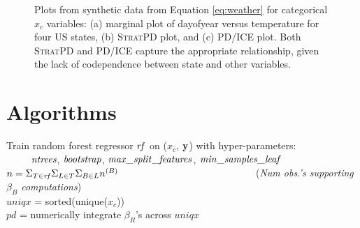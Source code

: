 \documentclass[12pt]{article}
\newcommand{\spd}{\fontfamily{cmr}\textsc{\small StratPD}}
\newcommand{\xnc}{$x_{\overline{c}}$}
\begin{document}
{\begin{appendices}
\begin{figure}[htbp]
\begin{center}
\caption{Plots from synthetic data from Equation \eqref{eq:weather} for categorical $x_c$ variables: (a) marginal plot of dayofyear versus temperature for four US states, (b) \spd{} plot, and (c) PD/ICE plot. Both \spd{} and PD/ICE capture the appropriate relationship, given the lack of codependence between state and other variables.}
\label{fig:state_vs_temp}
\end{center}
\end{figure}

\newpage
\section{Algorithms}\label{appendix:algorithms}

\setlength{\algomargin}{5pt}
\begin{algorithm}[]
\DontPrintSemicolon
\LinesNumbered
{}
\SetAlgoSkip{}
\SetInd{.5em}{.5em}
\small
{}
Train random forest regressor $\it rf$ on (\xnc{}, $\bf y$) with hyper-parameters:\\
~~~~~$\it ntrees$, $\it bootstrap$, $\it max\_split\_features$, ${\it min\_samples\_leaf}$ \\
$n = \Sigma_{T \in {\it rf}} \Sigma_{L \in T} \Sigma_{B \in L} n^{(B)}$~~~~~~~~~~~~~~~~~~~~~~~~~~~~({\it Num obs.'s supporting $\beta_B$ computations})\\
$uniqx$ = sorted(unique($x_c$))\\
$pd$ = numerically integrate $\beta_R$'s across $uniqx$\\
\label{alg:StratPD}
\end{algorithm}



\end{appendices}}
\end{document}
